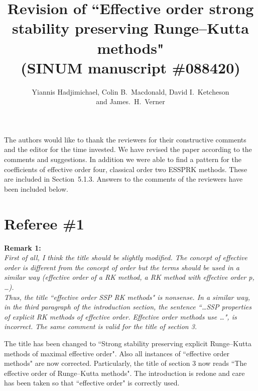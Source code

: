 \documentclass[12pt]{article}
\newcommand{\remark}[2]{\vspace{25pt} \noindent \textbf{Remark #1:\newline} \textit{#2}\vspace{15pt}}
\renewcommand{\newline}{\vspace{15pt}\\}
\newcommand{\david}[1]{\textcolor{red}{\\\textbf{D: \footnotesize #1}\\}}
\newcommand{\yiannis}[1]{\textcolor{OliveGreen}{\\\textbf{Y: \footnotesize #1}\\}}
\begin{document}
\title{Revision of ``Effective order strong stability preserving Runge--Kutta methods" \\\vspace{10pt}
	\large{(SINUM manuscript \#088420)}}
\author{Yiannis Hadjimichael, Colin B.~Macdonald, David I.~Ketcheson \\ and  James.~H.~Verner}

\maketitle

The authors would like to thank the reviewers for their constructive comments and the
editor for the time invested. 
We have revised the paper according to the comments and suggestions.
In addition we were able to find a pattern for the coefficients of effective order four, 
classical order two ESSPRK methods.
These are included in Section~5.1.3.
Answers to the comments of the reviewers have been included below.
\vspace{30pt}

\section*{Referee \#1}
\remark{1}
{First of all, I think the title should be slightly modified. 
The concept of \textit{effective order} is different from the concept of \textit{order} 
but the terms should be used in a similar way (\textit{effective order of a RK method, 
a RK method with effective order p, \dots}).
\newline
Thus, the title ``effective order SSP RK methods" is nonsense.
In a similar way, in the third paragraph of the introduction section, the sentence 
``\dots SSP properties of explicit RK methods of effective order. Effective order 
methods use \dots", is incorrect.
The same comment is valid for the title of section 3.}

The title has been changed to ``Strong stability preserving explicit Runge--Kutta methods of maximal effective order". 
Also all instances of ``effective order methods" are now corrected.
Particularly, the title of section 3 now reads ``The effective order of Runge--Kutta 
methods". %
The introduction is redone and care has been taken so that ``effective order" 
is correctly used.

%
\end{document}
